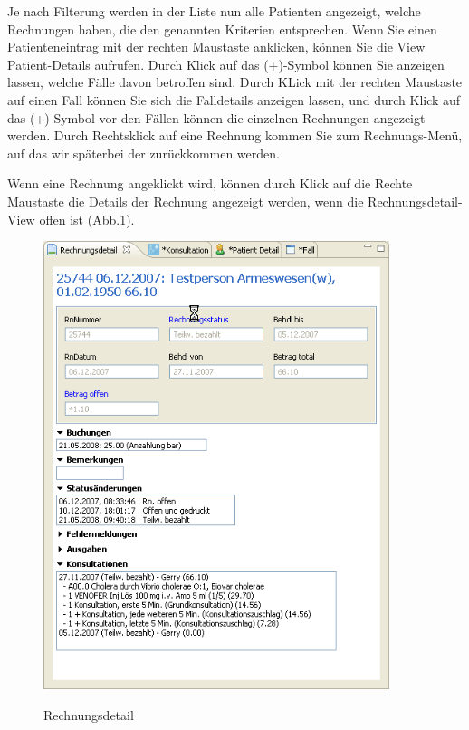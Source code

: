 \documentclass[a4paper]{scrartcl}
\begin{document}
Je nach Filterung werden in der Liste nun alle Patienten angezeigt, welche Rechnungen haben, die den genannten Kriterien entsprechen. Wenn Sie einen Patienteneintrag mit der rechten Maustaste anklicken, können Sie die View Patient-Details aufrufen. Durch Klick auf das (+)-Symbol können Sie anzeigen lassen, welche Fälle davon betroffen sind. Durch KLick mit der rechten Maustaste auf einen Fall können Sie sich die Falldetails anzeigen lassen, und durch Klick auf das (+) Symbol vor den Fällen können die einzelnen Rechnungen angezeigt werden. Durch Rechtsklick auf eine Rechnung kommen Sie zum Rechnungs-Menü, auf das wir späterbei der zurückkommen werden.

\medskip

Wenn eine Rechnung angeklickt wird, können durch Klick auf die Rechte Maustaste die Details der Rechnung angezeigt werden, wenn die Rechnungsdetail-View offen ist (Abb.\ref{fig:abr13}).
\begin{figure}
  \includegraphics[width=0.9\textwidth]{abr13}\\
  \caption{Rechnungsdetail}\label{fig:abr13}
\end{figure}
\end{document}
